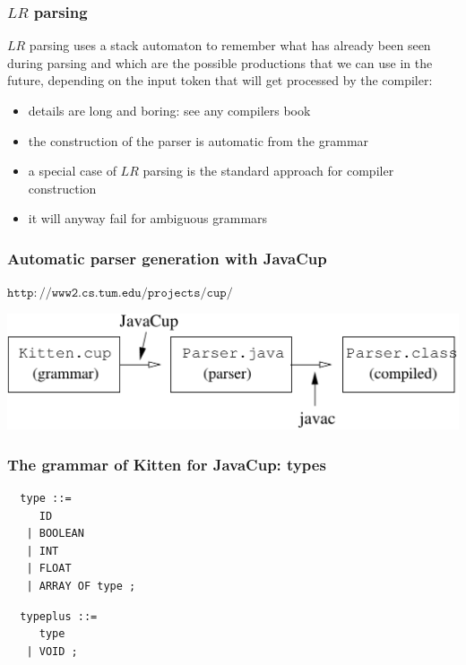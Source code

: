 \documentclass[11pt]{beamer}  %
\begin{document}
\begin{frame}\frametitle{$LR$ parsing}

\begin{greenbox}{}
$LR$ parsing uses a stack automaton to remember what has already been seen during parsing
and which are the possible productions that we can use in the future, depending on the
input token that will get processed by the compiler:

\begin{itemize}
\item details are long and boring: see any compilers book
\item the construction of the parser is automatic from the grammar
\item a special case of $LR$ parsing is the standard approach for compiler construction
\item it will anyway fail for ambiguous grammars
\end{itemize}

\end{greenbox}

\end{frame}

\begin{frame}\frametitle{Automatic parser generation with JavaCup}

$\mathtt{http://www2.cs.tum.edu/projects/cup/}$

\begin{center}
\includegraphics[scale=0.6]{pictures/java_cup.pdf}
\end{center}

\end{frame}

\begin{frame}[fragile]\frametitle{The grammar of Kitten for JavaCup: types}

\begin{verbatim}
  type ::=
     ID
   | BOOLEAN
   | INT
   | FLOAT
   | ARRAY OF type ;
\end{verbatim}

\begin{verbatim}
  typeplus ::=
     type
   | VOID ;
\end{verbatim}

\end{frame}
\end{document}
